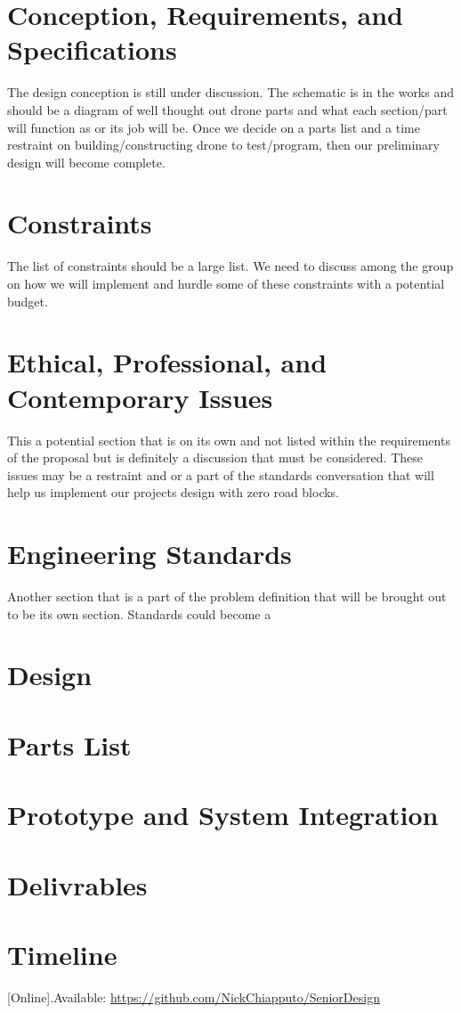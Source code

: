 \documentclass[conference]{IEEEtran}
\begin{document}
	\section{Conception, Requirements, and Specifications}
		The design conception is still under discussion. The schematic is in the works and should be a diagram of well thought out drone parts and what each section/part will function as or its job will be. Once we decide on a parts list and a time restraint on building/constructing drone to test/program, then our preliminary design will become complete.
	
	\section{Constraints}
		The list of constraints should be a large list. We need to discuss among the group on how we will implement and hurdle some of these constraints with a potential budget.

	\section{Ethical, Professional, and Contemporary Issues}
		This a potential section that is on its own and not listed within the requirements of the proposal but is definitely a discussion that must be considered. These issues may be a restraint and or a part of the standards conversation that will help us implement our projects design with zero road blocks.

	\section{Engineering Standards}
		Another section that is a part of the problem definition that will be brought out to be its own section. Standards could become a 

	\section{Design}


	\section{Parts List}


	\section{Prototype and System Integration}


	\section{Delivrables}


	\section{Timeline}


	\begin{thebibliography}{00}
		 [Online].Available: \url{https://github.com/NickChiapputo/SeniorDesign}
	\end{thebibliography}
\end{document}
